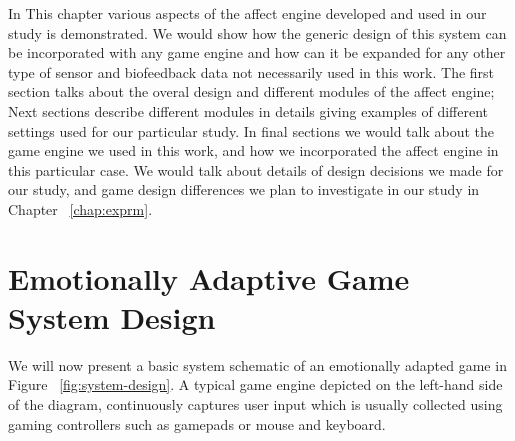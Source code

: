 
In This chapter various aspects of the affect engine developed and used in our study is demonstrated. We would show how the generic design of this system can be incorporated with any game engine and how can it be expanded for any other type of sensor and biofeedback data not necessarily used in this work. The first section talks about the overal design and different modules of the affect engine; Next sections describe different modules in details giving examples of different settings used for our particular study. In final sections we would talk about the game engine we used in this work, and how we incorporated the affect engine in this particular case. We would talk about details of design decisions we made for our study, and game design differences we plan to investigate in our study in Chapter ~\ref{chap:exprm}.

\section{Emotionally Adaptive Game System Design}

We will now present a basic system schematic of an emotionally adapted game in Figure ~\ref{fig:system-design}. A typical game engine depicted on the left-hand side of the diagram, continuously captures user input which is usually collected using gaming controllers such as gamepads or mouse and keyboard.

